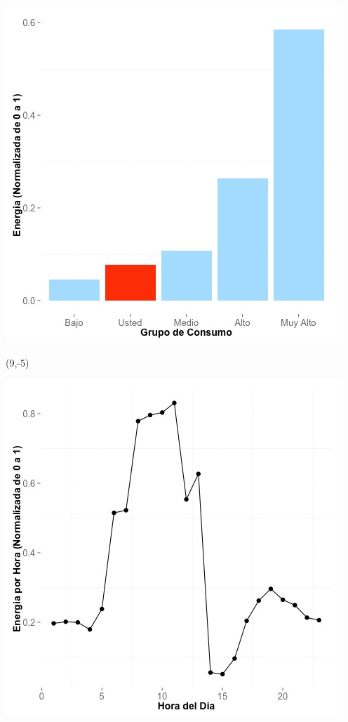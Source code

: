 \documentclass{article}\usepackage[]{graphicx}\usepackage[]{color}
\newenvironment{knitrout}{}{} %
\begin{document}
\begin{knitrout}
\color{fgcolor}
\includegraphics[scale=0.65]{figure/A2_neighbor_plot} 
\end{knitrout}

 \begin{textblock}{1}(9,-5)
\begin{minipage}{20em}
\begingroup

\endgroup
\end{minipage}
\end{textblock}


\begin{knitrout}
\color{fgcolor}
\includegraphics[scale=0.65]{figure/A2_plot_norm_median} 
\end{knitrout}
\end{document}
